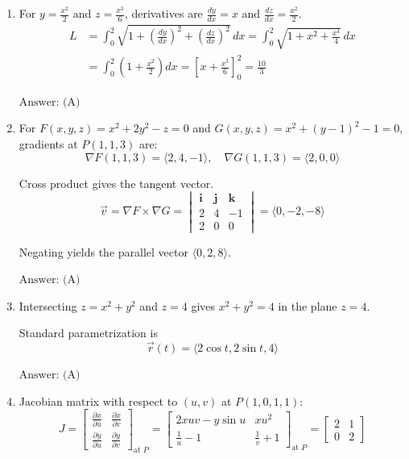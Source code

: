 \documentclass[a4paper, 12pt]{article}
\begin{document}
\begin{enumerate}[leftmargin=*,label=\textbf{\arabic*.}]
\item For $y = \frac{x^2}{2}$ and $z = \frac{x^3}{6}$, derivatives are $\frac{dy}{dx} = x$ and $\frac{dz}{dx} = \frac{x^2}{2}$.
\begin{align*}
    L &= \int_{0}^{2} \sqrt{1 + \left(\frac{dy}{dx}\right)^2 + \left(\frac{dz}{dx}\right)^2} \, dx = \int_{0}^{2} \sqrt{1 + x^2 + \frac{x^4}{4}} \, dx \\
      &= \int_{0}^{2} \left(1 + \frac{x^2}{2}\right) dx = \left[ x + \frac{x^3}{6} \right]_{0}^{2} = \frac{10}{3}
\end{align*}

$\boxed{\text{Answer: (A)}}$

\item For $F(x,y,z) = x^2 + 2y^2 - z = 0$ and $G(x,y,z) = x^2 + (y-1)^2 - 1 = 0$, gradients at $P(1,1,3)$ are:
\[\nabla F(1,1,3)=\langle 2, 4, -1 \rangle, \quad \nabla G(1,1,3) = \langle 2, 0, 0 \rangle\]

Cross product gives the tangent vector.
\[\vec{v} = \nabla F \times \nabla G = \begin{vmatrix} \mathbf{i} & \mathbf{j} & \mathbf{k} \\ 2 & 4 & -1 \\ 2 & 0 & 0 \end{vmatrix} = \langle 0, -2, -8 \rangle\]

Negating yields the parallel vector $\langle 0, 2, 8 \rangle$.

$\boxed{\text{Answer: (A)}}$

\item Intersecting $z = x^2 + y^2$ and $z = 4$ gives $x^2 + y^2 = 4$ in the plane $z = 4$.

Standard parametrization is
\[\vec{r}(t)=\langle2\cos t,2\sin t,4\rangle\]

$\boxed{\text{Answer: (A)}}$

\item Jacobian matrix with respect to $(u,v)$ at $P(1,0,1,1)$:
\[J = \begin{bmatrix} \frac{\partial x}{\partial u} & \frac{\partial x}{\partial v} \\[1em] \frac{\partial y}{\partial u} & \frac{\partial y}{\partial v} \end{bmatrix}_{\text{at } P}  = \begin{bmatrix} 2xuv - y\sin u & xu^2 \\ \frac{1}{u} - 1 & \frac{1}{v} + 1 \end{bmatrix}_{\text{at } P} = \begin{bmatrix} 2 & 1 \\ 0 & 2 \end{bmatrix}\]


\end{enumerate}
\end{document}
